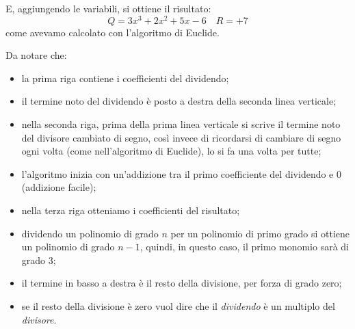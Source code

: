 
E, aggiungendo le variabili, si ottiene il risultato:
\[Q = 3 x^3 +2 x^2 +5 x -6 \quad R = +7\]
come avevamo calcolato con l'algoritmo di Euclide.

Da notare che:
\begin{itemize} [nosep]
 \item la prima riga contiene i coefficienti del dividendo;
 \item il termine noto del dividendo è posto a destra della seconda 
  linea verticale;
 \item nella seconda riga, prima della prima linea verticale si scrive 
  il   termine noto del divisore cambiato di segno, così invece di 
  ricordarsi di cambiare di segno ogni volta 
  (come nell'algoritmo di Euclide), lo si fa una volta per tutte;
 \item l'algoritmo inizia con un'addizione tra il primo coefficiente del 
  dividendo e \(0\) (addizione facile);
 \item nella terza riga otteniamo i coefficienti del risultato;
 \item dividendo un polinomio di grado \(n\) per un polinomio di primo 
  grado   si ottiene un polinomio di grado \(n-1\), quindi, in questo 
  caso, il primo monomio sarà di grado \(3\);
 \item il termine in basso a destra è il resto della divisione, 
  per forza di   grado zero;
 \item se il resto della divisione è zero vuol dire che il 
  \emph{dividendo} è un multiplo del \emph{divisore}.
\end{itemize}


